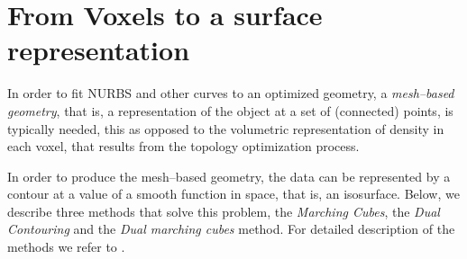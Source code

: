 \section{From Voxels to a surface representation}
\label{sec:surfaceBackg}
In order to fit NURBS and other curves to an optimized geometry, a \emph{mesh--based geometry}, that is, a representation of the object at a set of (connected) points, is typically needed, this as opposed to the volumetric representation of density in each voxel, that results from the topology optimization process. 

In order to produce the mesh--based geometry, the data can be represented by a contour at a value of a smooth function in space, that is, an isosurface. Below, we describe three methods that solve this problem, the \emph{Marching Cubes}, the \emph{Dual Contouring} and the \emph{Dual marching cubes} method. For detailed description of the methods we refer to .





